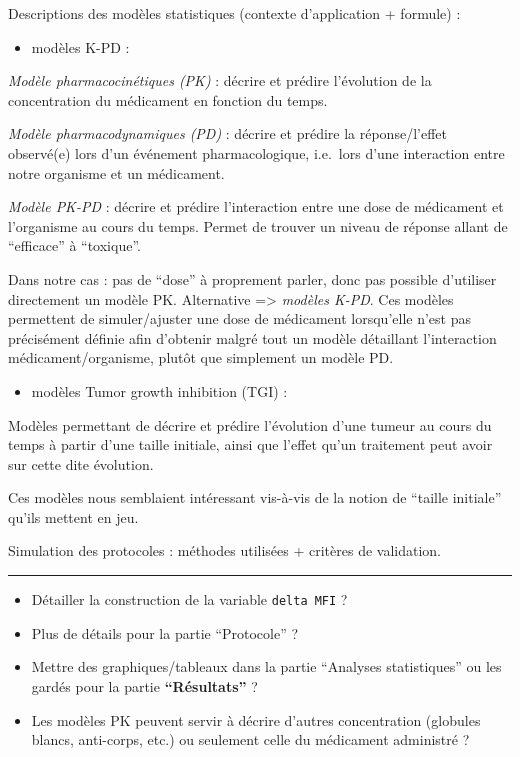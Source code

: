 \documentclass[
]{article}
\providecommand{\tightlist}{%
  \setlength{\itemsep}{0pt}\setlength{\parskip}{0pt}}
\begin{document}
Descriptions des modèles statistiques (contexte d'application + formule)
:

\begin{itemize}
\tightlist
\item
  modèles K-PD :
\end{itemize}

\emph{Modèle pharmacocinétiques (PK)} : décrire et prédire l'évolution
de la concentration du médicament en fonction du temps.

\emph{Modèle pharmacodynamiques (PD)} : décrire et prédire la
réponse/l'effet observé(e) lors d'un événement pharmacologique,
i.e.~lors d'une interaction entre notre organisme et un médicament.

\emph{Modèle PK-PD} : décrire et prédire l'interaction entre une dose de
médicament et l'organisme au cours du temps. Permet de trouver un niveau
de réponse allant de ``efficace'' à ``toxique''.

Dans notre cas : pas de ``dose'' à proprement parler, donc pas possible
d'utiliser directement un modèle PK. Alternative =\textgreater{}
\emph{modèles K-PD}. Ces modèles permettent de simuler/ajuster une dose
de médicament lorsqu'elle n'est pas précisément définie afin d'obtenir
malgré tout un modèle détaillant l'interaction médicament/organisme,
plutôt que simplement un modèle PD.

\begin{itemize}
\tightlist
\item
  modèles Tumor growth inhibition (TGI) :
\end{itemize}

Modèles permettant de décrire et prédire l'évolution d'une tumeur au
cours du temps à partir d'une taille initiale, ainsi que l'effet qu'un
traitement peut avoir sur cette dite évolution.

Ces modèles nous semblaient intéressant vis-à-vis de la notion de
``taille initiale'' qu'ils mettent en jeu.

Simulation des protocoles : méthodes utilisées + critères de validation.

\begin{center}\rule{0.5\linewidth}{0.5pt}\end{center}

\begin{itemize}
\tightlist
\item
  Détailler la construction de la variable \texttt{delta\ MFI} ?
\item
  Plus de détails pour la partie ``Protocole'' ?
\item
  Mettre des graphiques/tableaux dans la partie ``Analyses
  statistiques'' ou les gardés pour la partie \textbf{``Résultats''} ?
\item
  Les modèles PK peuvent servir à décrire d'autres concentration
  (globules blancs, anti-corps, etc.) ou seulement celle du médicament
  administré ?
\end{itemize}
\end{document}
